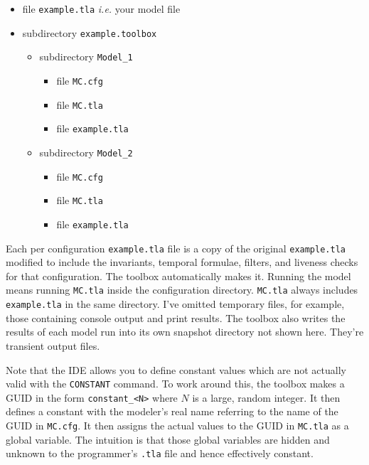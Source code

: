 \documentclass[twocolumn]{article}
\begin{document}
\begin{itemize}
\item file \texttt{example.tla} \emph{i.e.} your model file
\item subdirectory \texttt{example.toolbox}
	\begin{itemize}
		\item subdirectory \texttt{Model\_1}
		\begin{itemize}
			\item file \texttt{MC.cfg} 
			\item file \texttt{MC.tla}
			\item file \texttt{example.tla}
		\end{itemize}
	\end{itemize}
	\begin{itemize}
		\item subdirectory \texttt{Model\_2}
		\begin{itemize}
			\item file \texttt{MC.cfg}
			\item file \texttt{MC.tla}
			\item file \texttt{example.tla} 
		\end{itemize}
	\end{itemize}
\end{itemize}

\noindent Each per configuration \texttt{example.tla} file is a copy of the original \texttt{example.tla} modified to include the invariants, temporal formulae, filters, and liveness checks for that configuration. The toolbox automatically makes it. Running the model means running \texttt{MC.tla} inside the configuration directory. \texttt{MC.tla} always includes \texttt{example.tla} in the same directory. I've omitted temporary files, for example, those containing console output and print results. The toolbox also writes the results of each model run into its own snapshot directory not shown here. They're transient output files. 

Note that the IDE allows you to define constant values which are not actually valid with the \texttt{CONSTANT} command. To work around this, the toolbox makes a GUID in the form \texttt{constant\_<N>} where $N$ is a large, random integer. It then defines a constant with the modeler's real name referring to the name of the GUID in \texttt{MC.cfg}. It then assigns the actual values to the GUID in \texttt{MC.tla} as a global variable. The intuition is that those global variables are hidden and unknown to the programmer's \texttt{.tla} file and hence effectively constant.
\end{document}
